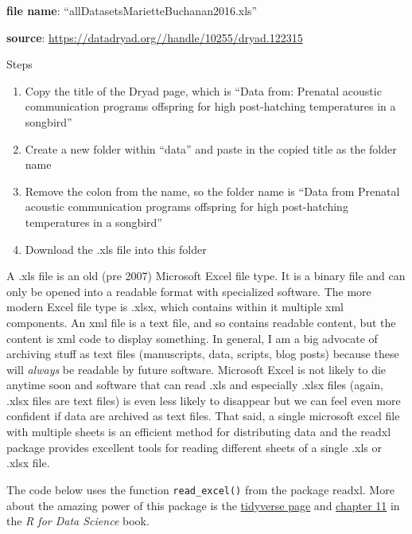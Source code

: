 \documentclass[]{book}
\providecommand{\tightlist}{%
  \setlength{\itemsep}{0pt}\setlength{\parskip}{0pt}}
\begin{document}
\textbf{file name}: ``allDatasetsMarietteBuchanan2016.xls''

\textbf{source}: \url{https://datadryad.org//handle/10255/dryad.122315}

Steps

\begin{enumerate}
\def\labelenumi{\arabic{enumi}.}
\tightlist
\item
  Copy the title of the Dryad page, which is ``Data from: Prenatal
  acoustic communication programs offspring for high post-hatching
  temperatures in a songbird''
\item
  Create a new folder within ``data'' and paste in the copied title as
  the folder name
\item
  Remove the colon from the name, so the folder name is ``Data from
  Prenatal acoustic communication programs offspring for high
  post-hatching temperatures in a songbird''
\item
  Download the .xls file into this folder
\end{enumerate}

A .xls file is an old (pre 2007) Microsoft Excel file type. It is a
binary file and can only be opened into a readable format with
specialized software. The more modern Excel file type is .xlsx, which
contains within it multiple xml components. An xml file is a text file,
and so contains readable content, but the content is xml code to display
something. In general, I am a big advocate of archiving stuff as text
files (manuscripts, data, scripts, blog posts) because these will
\emph{always} be readable by future software. Microsoft Excel is not
likely to die anytime soon and software that can read .xls and
especially .xlsx files (again, .xlsx files are text files) is even less
likely to disappear but we can feel even more confident if data are
archived as text files. That said, a single microsoft excel file with
multiple sheets is an efficient method for distributing data and the
readxl package provides excellent tools for reading different sheets of
a single .xls or .xlsx file.

The code below uses the function \texttt{read\_excel()} from the package
readxl. More about the amazing power of this package is the
\href{https://readxl.tidyverse.org}{tidyverse page} and
\href{http://r4ds.had.co.nz/data-import.html}{chapter 11} in the \emph{R
for Data Science} book.
\end{document}
